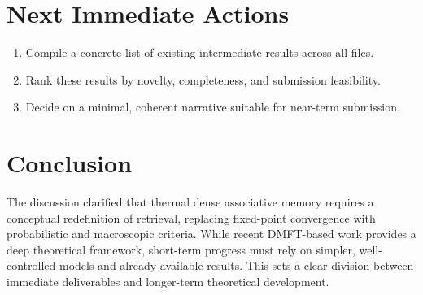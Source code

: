 \documentclass[11pt,a4paper]{article}
\begin{document}
\section*{Next Immediate Actions}

\begin{enumerate}
    \item Compile a concrete list of existing intermediate results across all files.
    \item Rank these results by novelty, completeness, and submission feasibility.
    \item Decide on a minimal, coherent narrative suitable for near-term submission.
\end{enumerate}

\section*{Conclusion}

The discussion clarified that thermal dense associative memory requires a conceptual redefinition of retrieval, replacing fixed-point convergence with probabilistic and macroscopic criteria. While recent DMFT-based work provides a deep theoretical framework, short-term progress must rely on simpler, well-controlled models and already available results. This sets a clear division between immediate deliverables and longer-term theoretical development.
\end{document}
